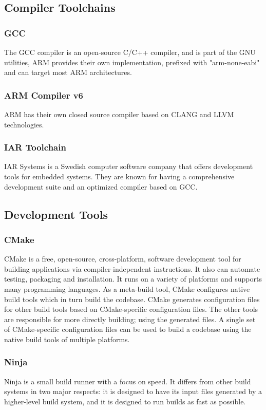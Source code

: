 \subsection{Compiler Toolchains}
\subsubsection{GCC}
The GCC compiler is an open-source C/C++ compiler, and is part of the GNU utilities, ARM provides their own implementation, prefixed with "arm-none-eabi" and can target most ARM architectures.
\subsubsection{ARM Compiler v6}
ARM has their own closed source compiler based on CLANG and LLVM technologies.
\subsubsection{IAR Toolchain}
IAR Systems is a Swedish computer software company that offers development tools for embedded systems. They are known for having a comprehensive development suite and an optimized compiler based on GCC.
\subsection{Development Tools}
\subsubsection{CMake}
CMake is a free, open-source, cross-platform, software development tool for building applications via compiler-independent instructions. It also can automate testing, packaging and installation. It runs on a variety of platforms and supports many programming languages.
As a meta-build tool, CMake configures native build tools which in turn build the codebase. CMake generates configuration files for other build tools based on CMake-specific configuration files. The other tools are responsible for more directly building; using the generated files. A single set of CMake-specific configuration files can be used to build a codebase using the native build tools of multiple platforms.
\subsubsection{Ninja}
Ninja is a small build runner with a focus on speed. It differs from other build systems in two major respects: it is designed to have its input files generated by a higher-level build system, and it is designed to run builds as fast as possible.
